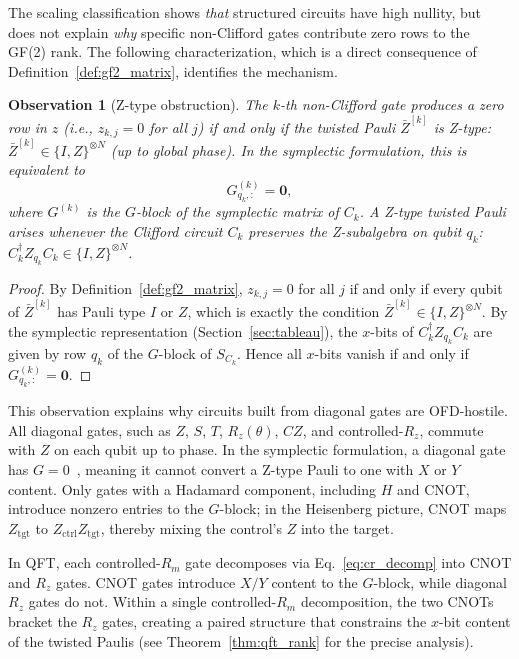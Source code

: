\documentclass[a4paper,twocolumn,11pt]{quantumarticle}
\newtheorem{observation}[theorem]{Observation}
\begin{document}
The scaling classification shows \emph{that} structured circuits have high nullity, but does not explain \emph{why} specific non-Clifford gates contribute zero rows to the GF(2) rank.
The following characterization, which is a direct consequence of Definition~\ref{def:gf2_matrix}, identifies the mechanism.

\begin{observation}[Z-type obstruction]
\label{prop:z_type}
The $k$-th non-Clifford gate produces a zero row in $z$ (i.e., $z_{k,j} = 0$ for all $j$) if and only if the twisted Pauli $\bar{Z}^{[k]}$ is Z-type: $\bar{Z}^{[k]} \in \{I, Z\}^{\otimes N}$ (up to global phase).
In the symplectic formulation, this is equivalent to
\begin{equation}
G^{(k)}_{q_k,:} = \mathbf{0},
\end{equation}
where $G^{(k)}$ is the $G$-block of the symplectic matrix of $C_k$.
A Z-type twisted Pauli arises whenever the Clifford circuit $C_k$ preserves the Z-subalgebra on qubit $q_k$: $C_k^\dagger Z_{q_k} C_k \in \{I, Z\}^{\otimes N}$.
\end{observation}

\begin{proof}
By Definition~\ref{def:gf2_matrix}, $z_{k,j} = 0$ for all $j$ if and only if every qubit of $\bar{Z}^{[k]}$ has Pauli type $I$ or $Z$, which is exactly the condition $\bar{Z}^{[k]} \in \{I,Z\}^{\otimes N}$.
By the symplectic representation (Section~\ref{sec:tableau}), the $x$-bits of $C_k^\dagger Z_{q_k} C_k$ are given by row $q_k$ of the $G$-block of $S_{C_k}$.
Hence all $x$-bits vanish if and only if $G^{(k)}_{q_k,:} = \mathbf{0}$.
\end{proof}

This observation explains why circuits built from diagonal gates are OFD-hostile.
All diagonal gates, such as $Z$, $S$, $T$, $R_z(\theta)$, $CZ$, and controlled-$R_z$, commute with $Z$ on each qubit up to phase.
In the symplectic formulation, a diagonal gate has $G = 0$~\cite{Dehaene2003}, meaning it cannot convert a Z-type Pauli to one with $X$ or $Y$ content.
Only gates with a Hadamard component, including $H$ and CNOT, introduce nonzero entries to the $G$-block; in the Heisenberg picture, CNOT maps $Z_{\mathrm{tgt}}$ to $Z_{\mathrm{ctrl}} Z_{\mathrm{tgt}}$, thereby mixing the control's $Z$ into the target.

In QFT, each controlled-$R_m$ gate decomposes via Eq.~\eqref{eq:cr_decomp} into CNOT and $R_z$ gates.
CNOT gates introduce $X/Y$ content to the $G$-block, while diagonal $R_z$ gates do not.
Within a single controlled-$R_m$ decomposition, the two CNOTs bracket the $R_z$ gates, creating a paired structure that constrains the $x$-bit content of the twisted Paulis (see Theorem~\ref{thm:qft_rank} for the precise analysis).
\end{document}
